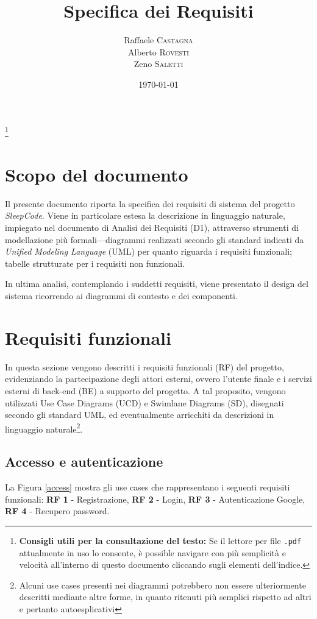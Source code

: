 \documentclass[11pt, a4paper]{article}
\title{Specifica dei Requisiti}
\author{Raffaele \textsc{Castagna}\\
Alberto \textsc{Rovesti}\\
Zeno \textsc{Saletti}}
\date{\today}
\theoremstyle{definition} %
\newcommand\blfootnote[1]{%
  \begingroup
  \renewcommand\thefootnote{}\footnote{#1}%
  \addtocounter{footnote}{-1}%
  \endgroup
}
\begin{document}


\tableofcontents\blfootnote{\textbf{Consigli utili per la consultazione del testo:} Se il lettore per file \texttt{.pdf} attualmente in uso lo consente, è possible navigare con più semplicità e velocità all'interno di questo documento cliccando sugli elementi dell'indice.}

\afterpage{\cfoot{\thepage}}
\newpage
\section*{Scopo del documento}
Il presente documento riporta la specifica dei requisiti di sistema
del progetto \textit{SleepCode}. Viene in particolare estesa la descrizione
in linguaggio naturale, impiegato nel documento di Analisi dei Requisiti
(D1), attraverso strumenti di modellazione più formali—diagrammi
realizzati secondo gli standard indicati da \textit{Unified Modeling Language}
(UML) per quanto riguarda i requisiti funzionali; tabelle strutturate
per i requisiti non funzionali.

In ultima analisi, contemplando i suddetti requisiti, viene presentato il
design del sistema ricorrendo ai diagrammi di contesto e dei componenti.


\newpage
\section{Requisiti funzionali}
In questa sezione vengono descritti i requisiti funzionali (RF) del
progetto, evidenziando la partecipazione degli attori esterni, ovvero
l'utente finale e i servizi esterni di back-end (BE) a supporto del progetto. A tal
proposito, vengono utilizzati Use Case Diagrams (UCD) e Swimlane Diagrams (SD),
disegnati secondo gli standard UML, ed eventualmente arricchiti da
descrizioni in linguaggio naturale\footnote{Alcuni use cases presenti
nei diagrammi potrebbero non essere ulteriormente descritti mediante
altre forme, in quanto ritenuti più semplici rispetto ad altri e pertanto
autoesplicativi}.

\subsection{Accesso e autenticazione}\label{accessoeautenticazione}
La Figura \ref{access} mostra gli use cases che rappresentano i seguenti
requisiti funzionali: \textbf{RF 1} - Registrazione,
\textbf{RF 2} - Login, \textbf{RF 3} - Autenticazione Google, \textbf{RF 4} - Recupero
password.
\end{document}
